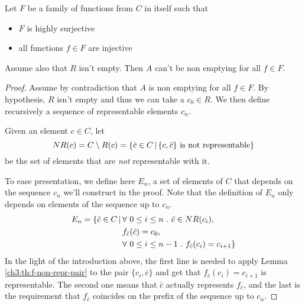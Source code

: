 \begin{theorem}\label{ch4:th:non-empt-res-local-basic}
	Let $F$ be a family of functions from $C$ in itself such that
	\begin{itemize}
		\item $F$ is highly surjective
		\item all functions $f \in F$ are injective
	\end{itemize}
	Assume also that $R$ isn't empty. Then $A$ can't be non emptying for all $f \in F$.
\end{theorem}
\begin{proof}
	Assume by contradiction that $A$ is non emptying for all $f \in F$. By hypothesis, $R$ isn't empty and thus we can take a $c_0 \in R$. We then define recursively a sequence of representable elements $c_n$.

	Given an element $c \in C$, let
	\[
	NR(c) = C \setminus R(c) = \{ \bar{c} \in C \,\vert\, \{ c, \bar{c} \} \text{ is not representable} \}
	\]
	be the set of elements that are \textit{not} representable with it.

	To ease presentation, we define here $E_n$, a set of elements of $C$ that depends on the sequence $c_n$ we'll construct in the proof. Note that the definition of $E_n$ only depends on elements of the sequence up to $c_n$.
	\begin{align*}
		E_n = \{\bar{c} \in C \svert & \forall\ 0 \le i \le n \ .\ \bar{c} \in NR(c_i), \\
		& f_{\bar{c}}(\bar{c}) = c_0, \\
		& \forall\ 0 \le i \le n - 1 \ .\ f_{\bar{c}}(c_i) = c_{i + 1} \}
	\end{align*}
	In the light of the introduction above, the first line is needed to apply Lemma \ref{ch3:th:f-non-repr-pair} to the pair $\{ c_i, \bar{c} \}$ and get that $f_{\bar{c}}(c_i) = c_{i+1}$ is representable. The second one means that $\bar{c}$ actually represents $f_{\bar{c}}$, and the last is the requirement that $f_{\bar{c}}$ coincides on the prefix of the sequence up to $c_n$.


\end{proof}
